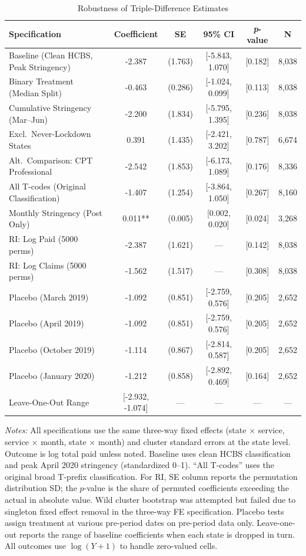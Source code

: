 \begin{table}[htbp]
\centering
\caption{Robustness of Triple-Difference Estimates}
\label{tab:robustness}
\small
\begin{tabular}{lccccc}
\hline\hline
Specification & Coefficient & SE & 95\% CI & \textit{p}-value & N \\
\hline
Baseline (Clean HCBS, Peak Stringency) & -2.387 & (1.763) & [-5.843, 1.070] & [0.182] & 8,038 \\
Binary Treatment (Median Split) & -0.463 & (0.286) & [-1.024, 0.099] & [0.113] & 8,038 \\
Cumulative Stringency (Mar--Jun) & -2.200 & (1.834) & [-5.795, 1.395] & [0.236] & 8,038 \\
Excl.~Never-Lockdown States & 0.391 & (1.435) & [-2.421, 3.202] & [0.787] & 6,674 \\
Alt.~Comparison: CPT Professional & -2.542 & (1.853) & [-6.173, 1.089] & [0.176] & 8,336 \\
All T-codes (Original Classification) & -1.407 & (1.254) & [-3.864, 1.050] & [0.267] & 8,160 \\
Monthly Stringency (Post Only) & 0.011** & (0.005) & [0.002, 0.020] & [0.024] & 3,268 \\
RI: Log Paid (5000 perms) & -2.387 & (1.621) & --- & [0.142] & 8,038 \\
RI: Log Claims (5000 perms) & -1.562 & (1.517) & --- & [0.308] & 8,038 \\
Placebo (March 2019) & -1.092 & (0.851) & [-2.759, 0.576] & [0.205] & 2,652 \\
Placebo (April 2019) & -1.092 & (0.851) & [-2.759, 0.576] & [0.205] & 2,652 \\
Placebo (October 2019) & -1.114 & (0.867) & [-2.814, 0.587] & [0.205] & 2,652 \\
Placebo (January 2020) & -1.212 & (0.858) & [-2.892, 0.469] & [0.164] & 2,652 \\
Leave-One-Out Range & [-2.932, -1.074] & --- & --- & --- & --- \\
\hline\hline
\end{tabular}
\begin{minipage}{0.95\textwidth}
\vspace{4pt}
\footnotesize
\textit{Notes:} All specifications use the same three-way fixed effects (state $\times$ service, service $\times$ month, state $\times$ month) and cluster standard errors at the state level. Outcome is log total paid unless noted. Baseline uses clean HCBS classification and peak April 2020 stringency (standardized 0--1). ``All T-codes'' uses the original broad T-prefix classification. For RI, SE column reports the permutation distribution SD; the $p$-value is the share of permuted coefficients exceeding the actual in absolute value. Wild cluster bootstrap was attempted but failed due to singleton fixed effect removal in the three-way FE specification. Placebo tests assign treatment at various pre-period dates on pre-period data only. Leave-one-out reports the range of baseline coefficients when each state is dropped in turn. All outcomes use $\log(Y + 1)$ to handle zero-valued cells.
\end{minipage}
\end{table}
